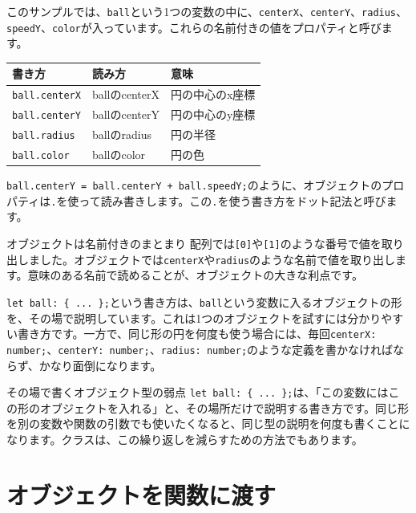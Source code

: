 このサンプルでは、\texttt{ball}という1つの変数の中に、\texttt{centerX}、\texttt{centerY}、\texttt{radius}、\texttt{speedY}、\texttt{color}が入っています。これらの名前付きの値をプロパティと呼びます。

\begin{center}
\begin{tabular}{lll}
\toprule
書き方 & 読み方 & 意味 \\
\midrule
\texttt{ball.centerX} & ballのcenterX & 円の中心のx座標 \\
\texttt{ball.centerY} & ballのcenterY & 円の中心のy座標 \\
\texttt{ball.radius} & ballのradius & 円の半径 \\
\texttt{ball.color} & ballのcolor & 円の色 \\
\bottomrule
\end{tabular}
\end{center}

\texttt{ball.centerY = ball.centerY + ball.speedY;}のように、オブジェクトのプロパティは\texttt{.}を使って読み書きします。この\texttt{.}を使う書き方をドット記法と呼びます。

\begin{pointbox}{オブジェクトは名前付きのまとまり}
配列では\texttt{[0]}や\texttt{[1]}のような番号で値を取り出しました。オブジェクトでは\texttt{centerX}や\texttt{radius}のような名前で値を取り出します。意味のある名前で読めることが、オブジェクトの大きな利点です。
\end{pointbox}

\texttt{let ball: \{ ... \};}という書き方は、\texttt{ball}という変数に入るオブジェクトの形を、その場で説明しています。これは1つのオブジェクトを試すには分かりやすい書き方です。一方で、同じ形の円を何度も使う場合には、毎回\texttt{centerX: number;}、\texttt{centerY: number;}、\texttt{radius: number;}のような定義を書かなければならず、かなり面倒になります。

\begin{notebox}{その場で書くオブジェクト型の弱点}
\texttt{let ball: \{ ... \};}は、「この変数にはこの形のオブジェクトを入れる」と、その場所だけで説明する書き方です。同じ形を別の変数や関数の引数でも使いたくなると、同じ型の説明を何度も書くことになります。クラスは、この繰り返しを減らすための方法でもあります。
\end{notebox}

\section{オブジェクトを関数に渡す}

